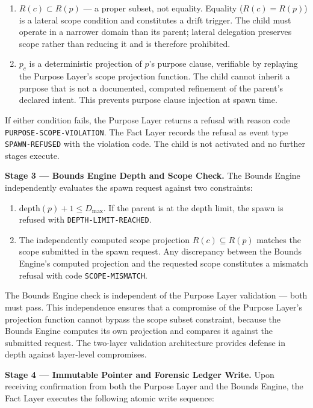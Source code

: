 \begin{enumerate}
  \item[(PL-V1)] $R(c) \subset R(p)$ — a proper subset, not equality. Equality ($R(c) = R(p)$) is a lateral scope condition and constitutes a drift trigger. The child must operate in a narrower domain than its parent; lateral delegation preserves scope rather than reducing it and is therefore prohibited.
  \item[(PL-V2)] $p_c$ is a deterministic projection of $p$'s purpose clause, verifiable by replaying the Purpose Layer's scope projection function. The child cannot inherit a purpose that is not a documented, computed refinement of the parent's declared intent. This prevents purpose clause injection at spawn time.
\end{enumerate}

If either condition fails, the Purpose Layer returns a refusal with reason code \texttt{PURPOSE-SCOPE-VIOLATION}. The Fact Layer records the refusal as event type \texttt{SPAWN-REFUSED} with the violation code. The child is not activated and no further stages execute.

\bigskip
\noindent\textbf{Stage 3 — Bounds Engine Depth and Scope Check.} The Bounds Engine independently evaluates the spawn request against two constraints:

\begin{enumerate}
  \item[(BE-V1)] $\mathrm{depth}(p) + 1 \leq D_{\max}$. If the parent is at the depth limit, the spawn is refused with \texttt{DEPTH-LIMIT-REACHED}.
  \item[(BE-V2)] The independently computed scope projection $R(c) \subseteq R(p)$ matches the scope submitted in the spawn request. Any discrepancy between the Bounds Engine's computed projection and the requested scope constitutes a mismatch refusal with code \texttt{SCOPE-MISMATCH}.
\end{enumerate}

The Bounds Engine check is independent of the Purpose Layer validation — both must pass. This independence ensures that a compromise of the Purpose Layer's projection function cannot bypass the scope subset constraint, because the Bounds Engine computes its own projection and compares it against the submitted request. The two-layer validation architecture provides defense in depth against layer-level compromises.

\bigskip
\noindent\textbf{Stage 4 — Immutable Pointer and Forensic Ledger Write.} Upon receiving confirmation from both the Purpose Layer and the Bounds Engine, the Fact Layer executes the following atomic write sequence:

